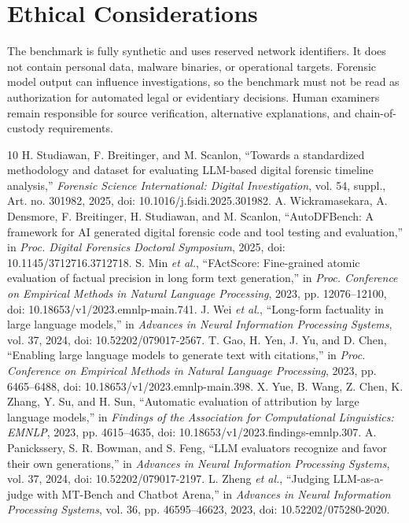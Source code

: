 \documentclass[conference]{IEEEtran}
\begin{document}
\section*{Ethical Considerations}
The benchmark is fully synthetic and uses reserved network identifiers. It does
not contain personal data, malware binaries, or operational targets. Forensic
model output can influence investigations, so the benchmark must not be read as
authorization for automated legal or evidentiary decisions. Human examiners
remain responsible for source verification, alternative explanations, and
chain-of-custody requirements.

\begin{thebibliography}{10}
 H. Studiawan, F. Breitinger, and M. Scanlon, ``Towards a standardized methodology and dataset for evaluating LLM-based digital forensic timeline analysis,'' \emph{Forensic Science International: Digital Investigation}, vol. 54, suppl., Art. no. 301982, 2025, doi: 10.1016/j.fsidi.2025.301982.
 A. Wickramasekara, A. Densmore, F. Breitinger, H. Studiawan, and M. Scanlon, ``AutoDFBench: A framework for AI generated digital forensic code and tool testing and evaluation,'' in \emph{Proc. Digital Forensics Doctoral Symposium}, 2025, doi: 10.1145/3712716.3712718.
 S. Min \emph{et al.}, ``FActScore: Fine-grained atomic evaluation of factual precision in long form text generation,'' in \emph{Proc. Conference on Empirical Methods in Natural Language Processing}, 2023, pp. 12076--12100, doi: 10.18653/v1/2023.emnlp-main.741.
 J. Wei \emph{et al.}, ``Long-form factuality in large language models,'' in \emph{Advances in Neural Information Processing Systems}, vol. 37, 2024, doi: 10.52202/079017-2567.
 T. Gao, H. Yen, J. Yu, and D. Chen, ``Enabling large language models to generate text with citations,'' in \emph{Proc. Conference on Empirical Methods in Natural Language Processing}, 2023, pp. 6465--6488, doi: 10.18653/v1/2023.emnlp-main.398.
 X. Yue, B. Wang, Z. Chen, K. Zhang, Y. Su, and H. Sun, ``Automatic evaluation of attribution by large language models,'' in \emph{Findings of the Association for Computational Linguistics: EMNLP}, 2023, pp. 4615--4635, doi: 10.18653/v1/2023.findings-emnlp.307.
 A. Panickssery, S. R. Bowman, and S. Feng, ``LLM evaluators recognize and favor their own generations,'' in \emph{Advances in Neural Information Processing Systems}, vol. 37, 2024, doi: 10.52202/079017-2197.
 L. Zheng \emph{et al.}, ``Judging LLM-as-a-judge with MT-Bench and Chatbot Arena,'' in \emph{Advances in Neural Information Processing Systems}, vol. 36, pp. 46595--46623, 2023, doi: 10.52202/075280-2020.

\end{thebibliography}
\end{document}
